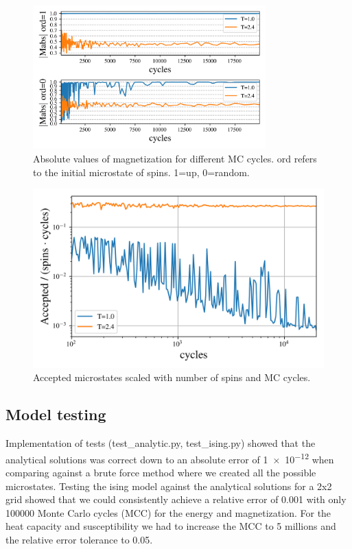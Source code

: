 \begin{figure}[H]
  \centering
  \includegraphics[width=0.8\textwidth]{../figures/equilibrium_Mabs.png}
  \caption{Absolute values of magnetization for different MC cycles.
  ord refers to the initial microstate of spins. 1=up, 0=random.}
  \label{fig:equi_M}
\end{figure}




\begin{figure}[H]
  \centering
  \includegraphics[width=\textwidth]{../figures/accepted.png}
  \caption{Accepted microstates scaled with number of spins and MC cycles.}
  \label{fig:accepted}
\end{figure}

\subsection{Model testing}

Implementation of tests (test\_analytic.py, test\_ising.py) showed that the
analytical solutions was correct down to an absolute error of \num{1e-12}  when
comparing against a brute force method where we created all the possible
microstates.
Testing the ising model against the analytical solutions for a 2x2 grid showed
that we could consistently achieve a relative error of 0.001 with only 100000
Monte Carlo cycles (MCC) for the energy and magnetization. For the heat capacity
and susceptibility we had to increase the MCC to 5 millions and the relative
error tolerance to 0.05.


